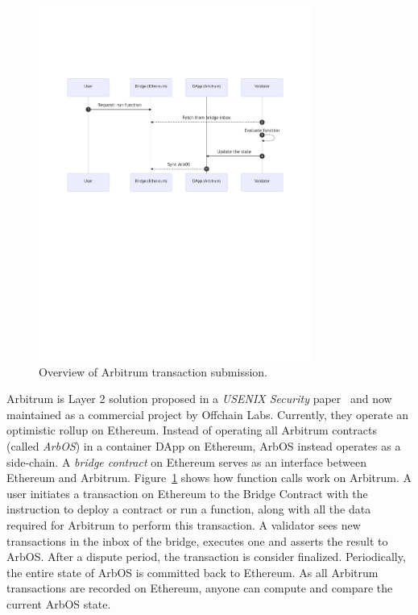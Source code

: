 \begin{figure}[t]
	\centering
	\includegraphics[width=0.8\textwidth]{figures/arbitrum.pdf}
	\caption{Overview of Arbitrum transaction submission.}
	\label{fig:arbsys}
\end{figure}

Arbitrum is Layer 2 solution proposed in a \textit{USENIX Security} paper~\cite{KGCWF18} and now maintained as a commercial project by Offchain Labs. Currently, they operate an optimistic rollup on Ethereum. Instead of operating all Arbitrum contracts (called \emph{ArbOS}) in a container DApp on Ethereum, ArbOS instead operates as a side-chain. A  \emph{bridge contract} on Ethereum serves as an interface between Ethereum and Arbitrum. Figure~\ref{fig:arbsys} shows how function calls work on Arbitrum. A user initiates a transaction on Ethereum to the Bridge Contract with the instruction to deploy a contract or run a function, along with all the data required for Arbitrum to perform this transaction. A validator sees new transactions in the inbox of the bridge, executes one and asserts the result to ArbOS. After a dispute period, the transaction is consider finalized. Periodically, the entire state of ArbOS is committed back to Ethereum. As all Arbitrum transactions are recorded on Ethereum, anyone can compute and compare the current ArbOS state.  

